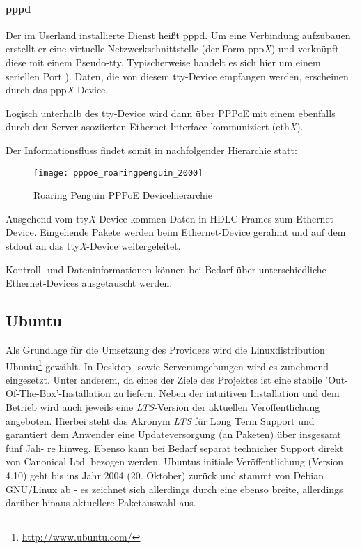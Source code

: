 \paragraph{pppd}
Der im Userland installierte Dienst heißt pppd. Um eine Verbindung aufzubauen
erstellt er eine virtuelle Netzwerkschnittstelle (der Form ppp\textit{X}) und verknüpft diese
mit einem Pseudo-\ac{tty}. %
Typischerweise handelt es sich hier um einem seriellen Port \cite{roaringpenguinpres}).
Daten, die von diesem tty-Device empfangen werden, erscheinen durch das ppp\textit{X}-Device.

Logisch unterhalb des tty-Device wird dann über PPPoE mit einem ebenfalls durch den Server
asoziierten Ethernet-Interface kommuniziert (eth\textit{X}).

Der Informationsfluss findet somit in nachfolgender Hierarchie statt:
 \begin{figure}[htp]
  \begin{center}
   \texttt{[image: pppoe\_roaringpenguin\_2000]}
  \end{center}
  \caption[Roaring Penguin PPPoE Devicehierarchie]{Roaring Penguin PPPoE Devicehierarchie \cite{roaringpenguinpres}}
  \label{fig:pppoe_roaringpenguin_devicehierarchy}
 \end{figure}

Ausgehend vom tty\textit{X}-Device kommen Daten in \ac{HDLC}-Frames zum Ethernet-Device.
Eingehende Pakete werden beim Ethernet-Device gerahmt und auf dem stdout an
das tty\textit{X}-Device weitergeleitet.

Kontroll- und Dateninformationen können bei Bedarf über unterschiedliche
Ethernet-Devices ausgetauscht werden.

\subsection{Ubuntu} %
\label{subsec:ubuntu}
Als Grundlage für die Umsetzung des Providers wird die Linuxdistribution Ubuntu\footnote{\url{http://www.ubuntu.com/}}
gewählt. In Desktop- sowie Serverumgebungen wird es zunehmend eingesetzt.
Unter anderem, da eines der Ziele des Projektes ist eine stabile
'Out-Of-The-Box'-Installation zu liefern. Neben der intuitiven Installation und dem
Betrieb wird auch jeweils eine \textit{LTS}-Version der aktuellen Veröffentlichung angeboten.
Hierbei steht das Akronym \textit{LTS} für Long Term Support und garantiert dem Anwender eine
Updateversorgung (an Paketen) über insgesamt fünf Jah-
re hinweg. Ebenso kann bei Bedarf separat technicher Support direkt von Canonical
Ltd. bezogen werden. Ubuntus initiale Veröffentlichung (Version 4.10) geht bis ins Jahr
2004 (20. Oktober) zurück und stammt von Debian GNU/Linux ab - es zeichnet sich
allerdings durch eine ebenso breite, allerdings darüber hinaus aktuellere Paketauswahl aus.

